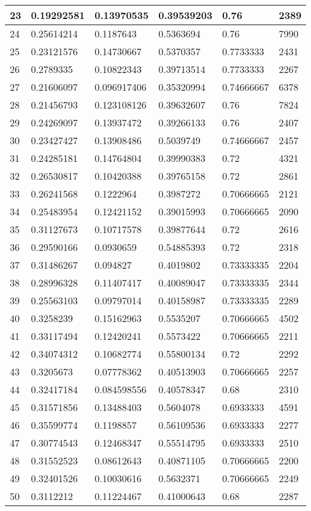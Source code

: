\begin{longtable}{|l|l|l|l|l|l|}
23 & 0.19292581 & 0.13970535 & 0.39539203 & 0.76 & 2389 \\ \hline 
24 & 0.25614214 & 0.1187643 & 0.5363694 & 0.76 & 7990 \\ \hline 
25 & 0.23121576 & 0.14730667 & 0.5370357 & 0.7733333 & 2431 \\ \hline 
26 & 0.2789335 & 0.10822343 & 0.39713514 & 0.7733333 & 2267 \\ \hline 
27 & 0.21606097 & 0.096917406 & 0.35320994 & 0.74666667 & 6378 \\ \hline 
28 & 0.21456793 & 0.123108126 & 0.39632607 & 0.76 & 7824 \\ \hline 
29 & 0.24269097 & 0.13937472 & 0.39266133 & 0.76 & 2407 \\ \hline 
30 & 0.23427427 & 0.13908486 & 0.5039749 & 0.74666667 & 2457 \\ \hline 
31 & 0.24285181 & 0.14764804 & 0.39990383 & 0.72 & 4321 \\ \hline 
32 & 0.26530817 & 0.10420388 & 0.39765158 & 0.72 & 2861 \\ \hline 
33 & 0.26241568 & 0.1222964 & 0.3987272 & 0.70666665 & 2121 \\ \hline 
34 & 0.25483954 & 0.12421152 & 0.39015993 & 0.70666665 & 2090 \\ \hline 
35 & 0.31127673 & 0.10717578 & 0.39877644 & 0.72 & 2616 \\ \hline 
36 & 0.29590166 & 0.0930659 & 0.54885393 & 0.72 & 2318 \\ \hline 
37 & 0.31486267 & 0.094827 & 0.4019802 & 0.73333335 & 2204 \\ \hline 
38 & 0.28996328 & 0.11407417 & 0.40089047 & 0.73333335 & 2344 \\ \hline 
39 & 0.25563103 & 0.09797014 & 0.40158987 & 0.73333335 & 2289 \\ \hline 
40 & 0.3258239 & 0.15162963 & 0.5535207 & 0.70666665 & 4502 \\ \hline 
41 & 0.33117494 & 0.12420241 & 0.5573422 & 0.70666665 & 2211 \\ \hline 
42 & 0.34074312 & 0.10682774 & 0.55800134 & 0.72 & 2292 \\ \hline 
43 & 0.3205673 & 0.07778362 & 0.40513903 & 0.70666665 & 2257 \\ \hline 
44 & 0.32417184 & 0.084598556 & 0.40578347 & 0.68 & 2310 \\ \hline 
45 & 0.31571856 & 0.13488403 & 0.5604078 & 0.6933333 & 4591 \\ \hline 
46 & 0.35599774 & 0.1198857 & 0.56109536 & 0.6933333 & 2277 \\ \hline 
47 & 0.30774543 & 0.12468347 & 0.55514795 & 0.6933333 & 2510 \\ \hline 
48 & 0.31552523 & 0.08612643 & 0.40871105 & 0.70666665 & 2200 \\ \hline 
49 & 0.32401526 & 0.10030616 & 0.5632371 & 0.70666665 & 2249 \\ \hline 
50 & 0.3112212 & 0.11224467 & 0.41000643 & 0.68 & 2287 \\ \hline 
\end{longtable}